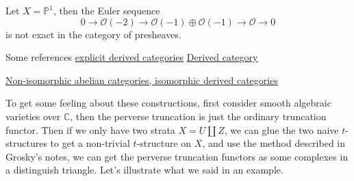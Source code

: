 \documentclass[../main.tex]{subfiles}
\begin{document}
\begin{example}
Let $X=\mathbb{P}^{1}$, then the Euler sequence 
$$0\rightarrow \mathcal{O}(-2)\rightarrow \mathcal{O}(-1)\oplus\mathcal{O}(-1)\rightarrow \mathcal{O}\rightarrow 0 $$
is not exact in the category of presheaves.
\end{example}

\begin{example}
Some references 
\href{https://www.math.utah.edu/dc/tilting.pdf}{explicit derived categories}
\href{http://www.math.wisc.edu/~andreic/publications/lnPoland.pdf}{Derived category}
\end{example}

\begin{example}
\href{https://math.berkeley.edu/~vivek/274/lec6.pdf}{Non-isomorphic abelian categories, isomorphic derived categories}
\end{example}

\begin{example}

\end{example}
\begin{remark}

\end{remark}


\begin{example}
To get some feeling about these constructions, first consider smooth algebraic varieties over $\mathbb{C}$, then the perverse truncation is just the ordinary truncation functor. Then if we only have two strata $X=U\amalg Z$, we can glue the two naive $t$-structures to get a non-trivial $t$-structure on $X$, and use the method described in Grosky's notes, we can get the perverse truncation functors as some complexes in a distinguish triangle. Let's illustrate what we said in an example.  
\end{example}
\end{document}
